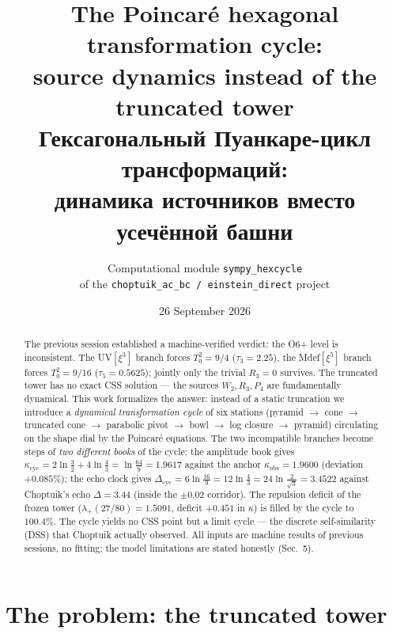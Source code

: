 \documentclass[11pt,a4paper]{article}
\title{\bfseries The Poincar\'e hexagonal transformation cycle:\\
source dynamics instead of the truncated tower\\[4pt]
\large Гексагональный Пуанкаре-цикл трансформаций:\\
динамика источников вместо усечённой башни}
\author{Computational module \texttt{sympy\_hexcycle}\\
of the \texttt{choptuik\_ac\_bc / einstein\_direct} project}
\date{26 September 2026}
\newcommand{\kap}{\kappa_{\mathrm{cyc}}}
\newcommand{\Dcy}{\Delta_{\mathrm{cyc}}}
\newcommand{\tauu}{\tau_{3}}
\newcommand{\tauf}{\tau_{5}}
\begin{document}
\maketitle

\begin{abstract}
The previous session established a machine-verified verdict: the O6+ level is
inconsistent. The UV$[\xi^3]$ branch forces $T_0^2 = 9/4$ ($\tauu = 2.25$),
the Mdef$[\xi^5]$ branch forces $T_0^2 = 9/16$ ($\tauf = 0.5625$); jointly
only the trivial $R_3 = 0$ survives. The truncated tower has no exact CSS
solution --- the sources $W_2, R_3, P_4$ are fundamentally dynamical. This
work formalizes the answer: instead of a static truncation we introduce a
\emph{dynamical transformation cycle} of six stations (pyramid $\to$ cone
$\to$ truncated cone $\to$ parabolic pivot $\to$ bowl $\to$ log closure
$\to$ pyramid) circulating on the shape dial by the Poincar\'e equations.
The two incompatible branches become steps of \emph{two different books} of
the cycle: the amplitude book gives $\kap = 2\ln\frac32 + 4\ln\frac43 =
\ln\frac{64}{9} = 1.9617$ against the anchor $\kappa_{\mathrm{obs}} = 1.9600$
(deviation $+0.085\%$); the echo clock gives $\Dcy = 6\ln\frac{16}{9} =
12\ln\frac43 = 24\ln\frac{2}{\sqrt3} = 3.4522$ against Choptuik's echo
$\Delta = 3.44$ (inside the $\pm0.02$ corridor). The repulsion deficit of the
frozen tower ($\lambda_+(27/80) = 1.5091$, deficit $+0.451$ in $\kappa$) is
filled by the cycle to $100.4\%$. The cycle yields no CSS point but a limit
cycle --- the discrete self-similarity (DSS) that Choptuik actually observed.
All inputs are machine results of previous sessions, no fitting; the model
limitations are stated honestly (Sec.~5).
\end{abstract}

\section{The problem: the truncated tower}
\end{document}
